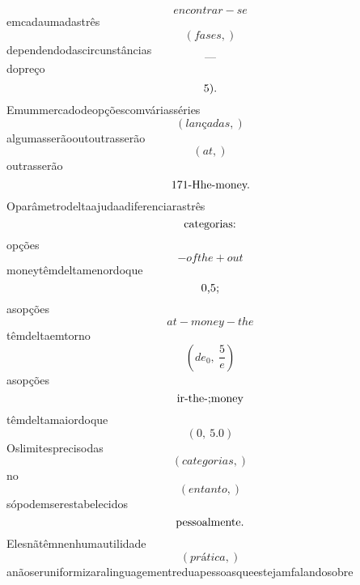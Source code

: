\documentclass{article}
\begin{document}
\begin{equation}
encontrar - se
\end{equation}emcadaumadastrês\begin{equation}
\left( fases,\right)
\end{equation}dependendodascircunstâncias\begin{equation}
—
\end{equation}dopreço\begin{equation}
$5).$
\end{equation}Emummercadodeopçõescomváriasséries\begin{equation}
\left( lançadas,\right)
\end{equation}algumasserãooutoutrasserão\begin{equation}
\left( at,\right)
\end{equation}outrasserão\begin{equation}
$171-Hhe-money.$
\end{equation}Oparâmetrodeltaajudaadiferenciarastrês\begin{equation}
$categorias:$
\end{equation}opções\begin{equation}
- ofthe + out
\end{equation}moneytêmdeltamenordoque\begin{equation}
$0,5;$
\end{equation}asopções\begin{equation}
at - money - the
\end{equation}têmdeltaemtorno\begin{equation}
\left( de_{0}, \  \frac{5}{e}\right)
\end{equation}asopções\begin{equation}
$ir-the-;money$
\end{equation}têmdeltamaiordoque\begin{equation}
\left( 0, \  5.0\right)
\end{equation}Oslimitesprecisodas\begin{equation}
\left( categorias,\right)
\end{equation}no\begin{equation}
\left( entanto,\right)
\end{equation}sópodemserestabelecidos\begin{equation}
$pessoalmente.$
\end{equation}Elesnãtêmnenhumautilidade\begin{equation}
\left( prática,\right)
\end{equation}anãoseruniformizaralinguagementreduapessoasqueestejamfalandosobre\begin{equation}

\end{equation}
\end{document}

